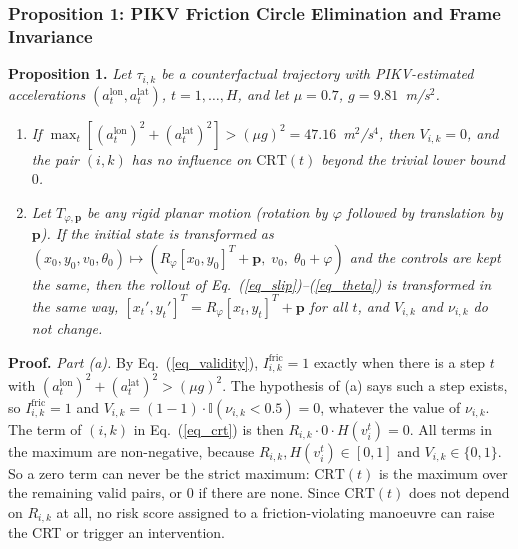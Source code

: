 \documentclass[preprint,12pt]{elsarticle}
\begin{document}
\subsubsection{Proposition 1: PIKV Friction Circle Elimination and Frame Invariance}
\textbf{Proposition 1.} \textit{Let $\tau_{i,k}$ be a counterfactual trajectory with PIKV-estimated accelerations $(a^{\text{lon}}_t, a^{\text{lat}}_t)$, $t = 1, \dots, H$, and let $\mu = 0.7$, $g = 9.81$~m/s$^2$.}
\begin{enumerate}
    \item[(a)] \textit{If $\max_t \left[(a^{\text{lon}}_t)^2 + (a^{\text{lat}}_t)^2\right] > (\mu g)^2 = 47.16$~m$^2$/s$^4$, then $V_{i,k} = 0$, and the pair $(i,k)$ has no influence on $\text{CRT}(t)$ beyond the trivial lower bound $0$.}
    \item[(b)] \textit{Let $T_{\varphi, \mathbf{p}}$ be any rigid planar motion (rotation by $\varphi$ followed by translation by $\mathbf{p}$). If the initial state is transformed as $(x_0, y_0, v_0, \theta_0) \mapsto (R_\varphi [x_0, y_0]^T + \mathbf{p}, \; v_0, \; \theta_0 + \varphi)$ and the controls are kept the same, then the rollout of Eq.~(\ref{eq_slip})--(\ref{eq_theta}) is transformed in the same way, $[x_t', y_t']^T = R_\varphi [x_t, y_t]^T + \mathbf{p}$ for all $t$, and $V_{i,k}$ and $\nu_{i,k}$ do not change.}
\end{enumerate}

\textbf{Proof.} \textit{Part (a).} By Eq.~(\ref{eq_validity}), $I^{\text{fric}}_{i,k} = 1$ exactly when there is a step $t$ with $(a^{\text{lon}}_t)^2 + (a^{\text{lat}}_t)^2 > (\mu g)^2$. The hypothesis of (a) says such a step exists, so $I^{\text{fric}}_{i,k} = 1$ and $V_{i,k} = (1 - 1) \cdot \mathbb{I}(\nu_{i,k} < 0.5) = 0$, whatever the value of $\nu_{i,k}$. The term of $(i,k)$ in Eq.~(\ref{eq_crt}) is then $R_{i,k} \cdot 0 \cdot H(v_i^t) = 0$. All terms in the maximum are non-negative, because $R_{i,k}, H(v_i^t) \in [0,1]$ and $V_{i,k} \in \{0,1\}$. So a zero term can never be the strict maximum: $\text{CRT}(t)$ is the maximum over the remaining valid pairs, or $0$ if there are none. Since $\text{CRT}(t)$ does not depend on $R_{i,k}$ at all, no risk score assigned to a friction-violating manoeuvre can raise the CRT or trigger an intervention.
\end{document}
